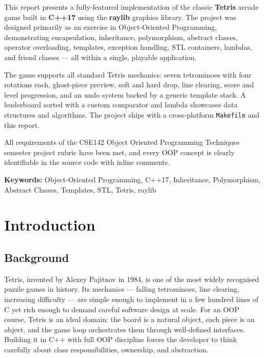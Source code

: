 \documentclass[11pt]{article}
\newcommand{\mycourse}{CSE142 Object Oriented Programming Techniques}
\begin{document}
This report presents a fully-featured implementation of the classic \textbf{Tetris} arcade game
built in \textbf{C++17} using the \textbf{raylib} graphics library.
The project was designed primarily as an exercise in Object-Oriented Programming,
demonstrating encapsulation, inheritance, polymorphism, abstract classes,
operator overloading, templates, exception handling, STL containers, lambdas, and friend classes
--- all within a single, playable application.

The game supports all standard Tetris mechanics: seven tetrominoes with four rotations each,
ghost-piece preview, soft and hard drop, line clearing, score and level progression,
and an undo system backed by a generic template stack.
A leaderboard sorted with a custom comparator and lambda showcases data structures and algorithms.
The project ships with a cross-platform \texttt{Makefile} and this report.

All requirements of the \mycourse{} semester project rubric have been met,
and every OOP concept is clearly identifiable in the source code with inline comments.

\vspace{0.3cm}
\noindent\textbf{Keywords:} Object-Oriented Programming, C++17, Inheritance, Polymorphism,
Abstract Classes, Templates, STL, Tetris, raylib

\newpage

\tableofcontents
\newpage

\section{Introduction}

\subsection{Background}
Tetris, invented by Alexey Pajitnov in 1984, is one of the most widely recognised puzzle
games in history. Its mechanics --- falling tetrominoes, line clearing, increasing difficulty
--- are simple enough to implement in a few hundred lines of C yet rich enough to demand
careful software design at scale.
For an OOP course, Tetris is an ideal domain: the board is a natural object, each piece is
an object, and the game loop orchestrates them through well-defined interfaces.
Building it in C++ with full OOP discipline forces the developer to think carefully about
class responsibilities, ownership, and abstraction.
\end{document}
